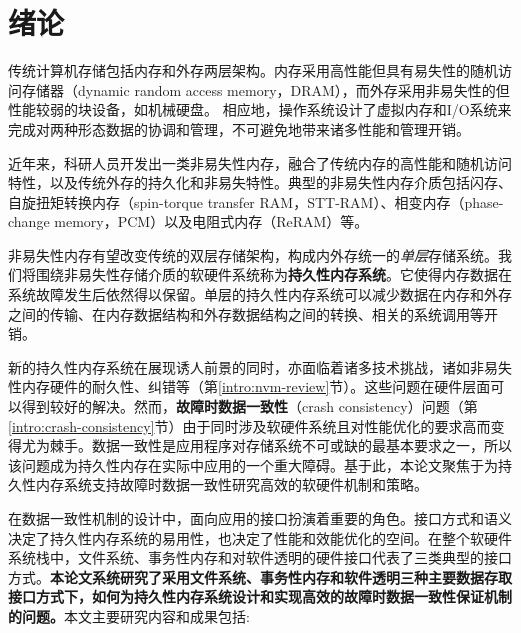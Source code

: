 \chapter{绪论}
\label{chap:intro}

传统计算机存储包括内存和外存两层架构。内存采用高性能但具有易失性的随机访问存储器（dynamic random access memory，DRAM），而外存采用非易失性的但性能较弱的块设备，如机械硬盘。
相应地，操作系统设计了虚拟内存和I/O系统\cite{Galvin:2013:OSC:2531466,Tanenbaum:2014:MOS:2655363}来完成对两种形态数据的协调和管理，不可避免地带来诸多性能和管理开销\cite{Lang:1977:DBP:320576.320585,Yu:2014:OBI:2642648.2619092}。

近年来，科研人员开发出一类非易失性内存，融合了传统内存的高性能和随机访问特性，以及传统外存的持久化和非易失特性。典型的非易失性内存介质包括闪存\cite{705361,542301}、自旋扭矩转换内存（spin-torque transfer RAM，STT-RAM）\cite{4443191,6557176}、相变内存（phase-change memory，PCM）\cite{Loke22062012,6176872,Raoux:2008:PRA,10.1109/MM.2010.24}以及电阻式内存（ReRAM）\cite{5607274}等。

非易失性内存有望改变传统的双层存储架构，构成内外存统一的\emph{单层}存储系统。我们将围绕非易失性存储介质的软硬件系统称为\textbf{持久性内存系统}。它使得内存数据在系统故障发生后依然得以保留。单层的持久性内存系统可以减少数据在内存和外存之间的传输、在内存数据结构和外存数据结构之间的转换、相关的系统调用等开销\cite{meza2013case}。

新的持久性内存系统在展现诱人前景的同时，亦面临着诸多技术挑战，诸如非易失性内存硬件的耐久性、纠错等（第\ref{intro:nvm-review}节）。这些问题在硬件层面可以得到较好的解决。然而，\textbf{故障时数据一致性}（crash consistency）问题（第\ref{intro:crash-consistency}节）由于同时涉及软硬件系统且对性能优化的要求高而变得尤为棘手。数据一致性是应用程序对存储系统不可或缺的最基本要求之一，所以该问题成为持久性内存在实际中应用的一个重大障碍\cite{Onur:2014:RPO}。基于此，本论文聚焦于为持久性内存系统支持故障时数据一致性研究高效的软硬件机制和策略。

在数据一致性机制的设计中，面向应用的接口扮演着重要的角色。接口方式和语义决定了持久性内存系统的易用性，也决定了性能和效能优化的空间。在整个软硬件系统栈中，文件系统、事务性内存和对软件透明的硬件接口代表了三类典型的接口方式。\textbf{本论文系统研究了采用文件系统、事务性内存和软件透明三种主要数据存取接口方式下，如何为持久性内存系统设计和实现高效的故障时数据一致性保证机制的问题。}本文主要研究内容和成果包括:

